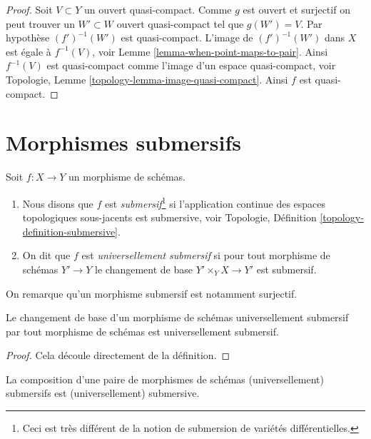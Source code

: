 \begin{proof}
Soit $V \subset Y$ un ouvert quasi-compact. Comme $g$ est ouvert
et surjectif on peut trouver un $W' \subset W$ ouvert quasi-compact tel
que $g(W') = V$. Par hypothèse $(f')^{-1}(W')$ est quasi-compact.
L'image de $(f')^{-1}(W')$ dans $X$ est
égale à $f^{-1}(V)$, voir Lemme \ref{lemma-when-point-maps-to-pair}.
Ainsi $f^{-1}(V)$ est quasi-compact comme l'image d'un espace quasi-compact,
voir Topologie, Lemme \ref{topology-lemma-image-quasi-compact}. Ainsi $f$
est quasi-compact.
\end{proof}





\section{Morphismes submersifs}
\label{section-submersive}

\begin{definition}
\label{definition-submersive}
Soit $f : X \to Y$ un morphisme de schémas.
\begin{enumerate}
\item Nous disons que $f$ est {\it submersif}\footnote{Ceci
est très différent de la notion de submersion de
variétés différentielles.} si l'application continue des espaces topologiques
sous-jacents est submersive, voir Topologie, Définition \ref{topology-definition-submersive}.
\item On dit que $f$ est {\it universellement submersif}
si pour tout morphisme de schémas $Y' \to Y$ le
changement de base $Y' \times_Y X \to Y'$ est submersif.
\end{enumerate}
\end{definition}

\noindent
On remarque qu'un morphisme submersif est notamment surjectif.

\begin{lemma}
\label{lemma-base-change-universally-submersive}
Le changement de base d'un morphisme de schémas universellement submersif
par tout morphisme de schémas est universellement submersif.
\end{lemma}

\begin{proof}
Cela découle directement de la définition.
\end{proof}

\begin{lemma}
\label{lemma-composition-universally-submersive}
La composition d’une paire de morphismes de schémas (universellement) submersifs
est (universellement) submersive.
\end{lemma}

